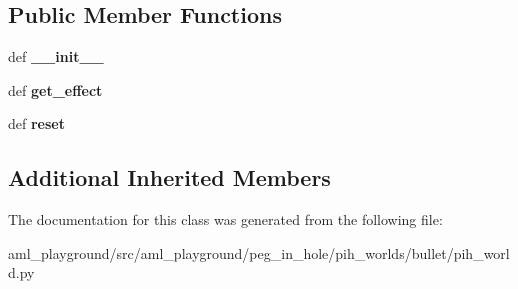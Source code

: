 \subsection*{Public Member Functions}
\begin{DoxyCompactItemize}
\item 
\hypertarget{classaml__playground_1_1peg__in__hole_1_1pih__worlds_1_1bullet_1_1pih__world_1_1_box_object_a760a10996d2011574da7d9528a324a16}{def {\bfseries \-\_\-\-\_\-init\-\_\-\-\_\-}}\label{classaml__playground_1_1peg__in__hole_1_1pih__worlds_1_1bullet_1_1pih__world_1_1_box_object_a760a10996d2011574da7d9528a324a16}

\item 
\hypertarget{classaml__playground_1_1peg__in__hole_1_1pih__worlds_1_1bullet_1_1pih__world_1_1_box_object_a996f669f242c73e939d81224f89f80b4}{def {\bfseries get\-\_\-effect}}\label{classaml__playground_1_1peg__in__hole_1_1pih__worlds_1_1bullet_1_1pih__world_1_1_box_object_a996f669f242c73e939d81224f89f80b4}

\item 
\hypertarget{classaml__playground_1_1peg__in__hole_1_1pih__worlds_1_1bullet_1_1pih__world_1_1_box_object_ab425448e2092e80840709e2896a73e93}{def {\bfseries reset}}\label{classaml__playground_1_1peg__in__hole_1_1pih__worlds_1_1bullet_1_1pih__world_1_1_box_object_ab425448e2092e80840709e2896a73e93}

\end{DoxyCompactItemize}
\subsection*{Additional Inherited Members}


The documentation for this class was generated from the following file\-:\begin{DoxyCompactItemize}
\item 
aml\-\_\-playground/src/aml\-\_\-playground/peg\-\_\-in\-\_\-hole/pih\-\_\-worlds/bullet/pih\-\_\-world.\-py\end{DoxyCompactItemize}
